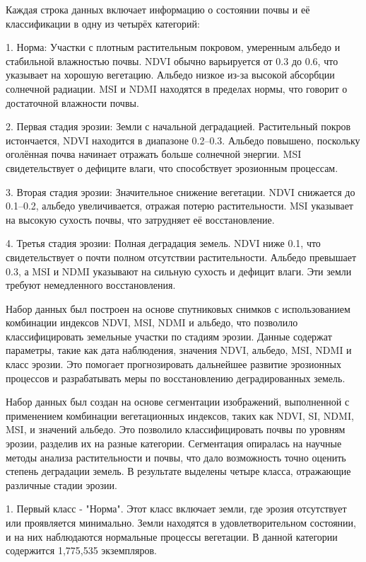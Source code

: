 \begin{multicols}{2}
Каждая строка данных включает информацию о состоянии почвы и её
классификации в одну из четырёх категорий:

1. Норма: Участки с плотным растительным покровом, умеренным
альбедо и стабильной влажностью почвы. NDVI обычно варьируется от 0.3
до 0.6, что указывает на хорошую вегетацию. Альбедо низкое из-за
высокой абсорбции солнечной радиации. MSI и NDMI находятся в пределах
нормы, что говорит о достаточной влажности почвы.

2. Первая стадия эрозии: Земли с начальной деградацией.
Растительный покров истончается, NDVI находится в диапазоне 0.2--0.3.
Альбедо повышено, поскольку оголённая почва начинает отражать больше
солнечной энергии. MSI свидетельствует о дефиците влаги, что
способствует эрозионным процессам.

3. Вторая стадия эрозии: Значительное снижение вегетации. NDVI
снижается до 0.1--0.2, альбедо увеличивается, отражая потерю
растительности. MSI указывает на высокую сухость почвы, что затрудняет
её восстановление.

4. Третья стадия эрозии: Полная деградация земель. NDVI ниже
0.1, что свидетельствует о почти полном отсутствии растительности.
Альбедо превышает 0.3, а MSI и NDMI указывают на сильную сухость и
дефицит влаги. Эти земли требуют немедленного восстановления.

Набор данных был построен на основе спутниковых снимков с использованием
комбинации индексов NDVI, MSI, NDMI и альбедо, что позволило
классифицировать земельные участки по стадиям эрозии. Данные содержат
параметры, такие как дата наблюдения, значения NDVI, альбедо, MSI, NDMI
и класс эрозии. Это помогает прогнозировать дальнейшее развитие
эрозионных процессов и разрабатывать меры по восстановлению
деградированных земель.

Набор данных был создан на основе сегментации изображений, выполненной с
применением комбинации вегетационных индексов, таких как NDVI, SI, NDMI,
MSI, и значений альбедо. Это позволило классифицировать почвы по уровням
эрозии, разделив их на разные категории. Сегментация опиралась на
научные методы анализа растительности и почвы, что дало возможность
точно оценить степень деградации земель. В результате выделены четыре
класса, отражающие различные стадии эрозии.

1. Первый класс - "Норма". Этот класс включает земли, где эрозия
отсутствует или проявляется минимально. Земли находятся в
удовлетворительном состоянии, и на них наблюдаются нормальные процессы
вегетации. В данной категории содержится 1,775,535 экземпляров.


\end{multicols}
